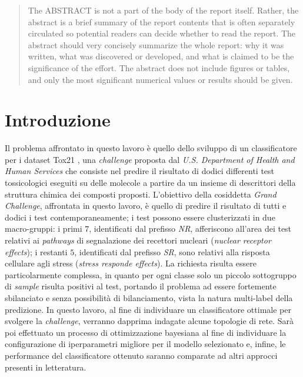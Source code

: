 \begin{abstract}
The ABSTRACT is not a part of the body of the report itself. Rather, the abstract is a brief summary of the report contents that is often separately circulated so potential readers can decide whether to read the report. The abstract should very concisely summarize the whole report: why it was written, what was discovered or developed, and what is claimed to be the significance of the effort. The abstract does not include figures or tables, and only the most significant numerical values or results should be given.
\end{abstract}

\newpage
{}
\section{Introduzione}
Il problema affrontato in questo lavoro è quello dello sviluppo di un classificatore per i dataset Tox21 \cite{challenge_site}, una \textit{challenge} proposta dal \textit{U.S. Department of Health and Human Services} che consiste nel predire il risultato di dodici differenti test tossicologici eseguiti su delle molecole a partire da un insieme di descrittori della struttura chimica dei composti proposti.
L'obiettivo della cosiddetta \textit{Grand Challenge}, affrontata in questo lavoro, è quello di predire il risultato di tutti e dodici i test contemporaneamente; i test possono essere clusterizzati in due macro-gruppi: i primi $7$, identificati dal prefisso \textit{NR}, afferiscono all'area dei test relativi ai \textit{pathways} di segnalazione dei recettori nucleari (\textit{nuclear receptor effects}); i restanti $5$, identificati dal prefisso \textit{SR}, sono relativi alla risposta cellulare agli stress (\textit{stress responde effects}).
La richiesta risulta essere particolarmente complessa, in quanto per ogni classe solo un piccolo sottogruppo di \textit{sample} risulta positivi al test, portando il problema ad essere fortemente sbilanciato e senza possibilità di bilanciamento, vista la natura multi-label della predizione.
In questo lavoro, al fine di individuare un classificatore ottimale per svolgere la \textit{challenge}, verranno dapprima indagate alcune topologie di rete. 
Sarà poi effettuato un processo di ottimizzazione bayesiana al fine di individuare la configurazione di iperparametri migliore per il modello selezionato e, infine, le performance del classificatore ottenuto saranno comparate ad altri approcci presenti in letteratura.

